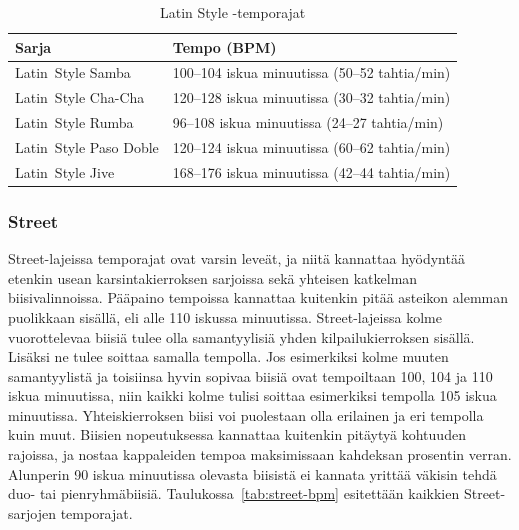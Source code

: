 \documentclass[12pt, a4paper, oneside]{article}
\begin{document}
\begin{table}[ht]
    \centering
    \setlength\tabcolsep{8mm}
    \renewcommand{\arraystretch}{1.5}
    \begin{tabular}{@{\hspace{0.25cm}}ll@{\hspace{0.25cm}}}
        \toprule
        Sarja                  & Tempo (BPM) \\ \midrule
        Latin~Style Samba      & 100--104 iskua minuutissa (50--52 tahtia/min) \\
        Latin~Style Cha-Cha    & 120--128 iskua minuutissa (30--32 tahtia/min) \\
        Latin~Style Rumba      &  96--108 iskua minuutissa (24--27 tahtia/min) \\
        Latin~Style Paso Doble & 120--124 iskua minuutissa (60--62 tahtia/min) \\
        Latin~Style Jive       & 168--176 iskua minuutissa (42--44 tahtia/min) \\
        \bottomrule
    \end{tabular}
    \caption{Latin Style -temporajat}
    \label{tab:latin-bpm}
\end{table}

\subsubsection{Street}

Street-lajeissa temporajat ovat varsin leveät,
ja niitä kannattaa hyödyntää etenkin usean karsintakierroksen sarjoissa sekä yhteisen katkelman biisivalinnoissa.
Pääpaino tempoissa kannattaa kuitenkin pitää asteikon alemman puolikkaan sisällä,
eli alle 110 iskussa minuutissa.
Street-lajeissa kolme vuorottelevaa biisiä tulee olla samantyylisiä yhden kilpailukierroksen sisällä.
Lisäksi ne tulee soittaa samalla tempolla.
Jos esimerkiksi kolme muuten samantyylistä ja toisiinsa hyvin sopivaa biisiä ovat tempoiltaan 100,
104 ja 110 iskua minuutissa,
niin kaikki kolme tulisi soittaa esimerkiksi tempolla 105 iskua minuutissa.
Yhteiskierroksen biisi voi puolestaan olla erilainen ja eri tempolla kuin muut.
Biisien nopeutuksessa kannattaa kuitenkin pitäytyä kohtuuden rajoissa,
ja nostaa kappaleiden tempoa maksimissaan kahdeksan prosentin verran.
Alunperin 90 iskua minuutissa olevasta biisistä ei kannata yrittää väkisin tehdä duo- tai pienryhmäbiisiä.
Taulukossa~\ref{tab:street-bpm} esitettään kaikkien Street-sarjojen temporajat. \medskip
\end{document}
